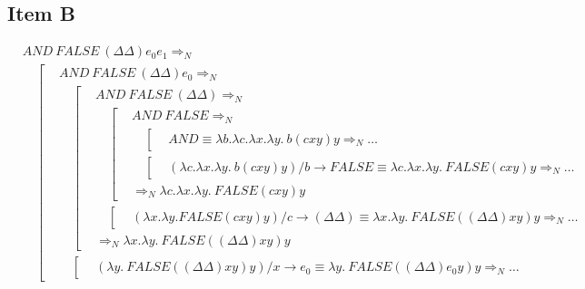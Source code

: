 \documentclass{article}
\begin{document}
\subsection*{Item B}
\begin{equation*}
  \begin{aligned}
    &AND\ FALSE\ (\Delta\Delta) e_0 e_1 \Rightarrow_N \\ 
    &\quad\left[
      \begin{aligned}
        &AND\ FALSE\ (\Delta\Delta) e_0 \Rightarrow_N \\
        &\quad\left[
          \begin{aligned}
            &AND\ FALSE\ (\Delta\Delta) \Rightarrow_N \\
            &\quad\left[
              \begin{aligned}
                &AND\ FALSE \Rightarrow_N \\
                &\quad\left[
                  \begin{aligned}
                    &AND \equiv \lambda b.\lambda c.\lambda x.\lambda y.\ b(cxy)y \Rightarrow_N \dots
                  \end{aligned}
                \right. \\ 
                &\quad\left[
                  \begin{aligned}
                    &(\lambda c.\lambda x.\lambda y.\ b(cxy)y) / b \to FALSE \equiv \lambda c.\lambda x.\lambda y.\ FALSE(cxy)y \Rightarrow_N \dots
                  \end{aligned}
                \right. \\ 
                &\Rightarrow_N \lambda c.\lambda x.\lambda y.\ FALSE(cxy)y
              \end{aligned}
            \right. \\ 
            &\quad\left[
              \begin{aligned}
                &(\lambda x.\lambda y. FALSE(cxy)y) / c \to (\Delta\Delta) \equiv \lambda x.\lambda y.\ FALSE((\Delta\Delta)xy)y \Rightarrow_N \dots
              \end{aligned}
            \right. \\ 
            &\Rightarrow_N \lambda x.\lambda y.\ FALSE((\Delta\Delta)xy)y 
          \end{aligned}
        \right. \\ 
        &\quad\left[
          \begin{aligned}
            &(\lambda y.\ FALSE((\Delta\Delta)xy)y) / x \to e_0 \equiv \lambda y.\ FALSE((\Delta\Delta)e_0y)y \Rightarrow_N \dots

\end{aligned}
\end{aligned}
\end{aligned}
\end{equation*}
\end{document}
